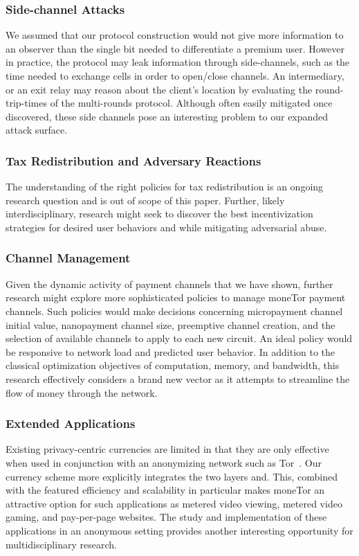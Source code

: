 \subsubsection{Side-channel Attacks} We assumed that our protocol construction would
not give more information to an observer than the single bit needed to
differentiate a premium user. However in practice, the protocol may leak
information through side-channels, such as the time needed to exchange cells in
order to open/close channels. An intermediary, or an exit relay may reason about
the client's location by evaluating the round-trip-times of the multi-rounds
protocol. Although often easily mitigated once discovered, these side channels
pose an interesting problem to our expanded attack surface.

\subsubsection{Tax Redistribution and Adversary Reactions}
The understanding of the right policies for tax redistribution is an ongoing
research question and is out of scope of this paper. Further, likely
interdisciplinary, research might seek to discover the best incentivization
strategies for desired user behaviors and while mitigating adversarial abuse.

\subsubsection{Channel Management} Given the dynamic activity of payment
channels that we have shown, further research might explore more sophisticated
policies to manage moneTor payment channels. Such policies would make decisions
concerning micropayment channel initial value, nanopayment channel size,
preemptive channel creation, and the selection of available channels to apply to
each new circuit. An ideal policy would be responsive to network load and
predicted user behavior. In addition to the classical optimization objectives of
computation, memory, and bandwidth, this research effectively considers a brand
new vector as it attempts to streamline the flow of money through the network.

\subsubsection{Extended Applications} Existing privacy-centric currencies are
limited in that they are only effective when used in conjunction with an
anonymizing network such as Tor~\cite{sasson2014zerocash}. Our currency scheme
more explicitly integrates the two layers and. This, combined with the featured
efficiency and scalability in particular makes moneTor an attractive option for
such applications as metered video viewing, metered video gaming, and
pay-per-page websites. The study and implementation of these applications in an
anonymous setting provides another interesting opportunity for multidisciplinary
research.
